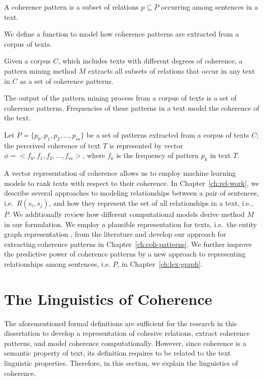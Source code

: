 \begin{definition}
\label{def:def-coh-pattern}
A coherence pattern is a subset of relations $p \subseteq P$ occurring among sentences in a text.   
\end{definition}

We define a function to model how coherence patterns are extracted from a corpus of texts. 

\begin{definition}
Given a corpus $C$, which includes texts with different degrees of coherence, a pattern mining method $M$ extracts all subsets of relations that occur in any text in $C$ as a set of coherence patterns. 
\end{definition} 

The output of the pattern mining process from a corpus of texts is a set of coherence patterns. 
Frequencies of these patterns in a text model the coherence of the text. 

\begin{definition}
Let $P=\lbrace p_0,p_1,p_2,...,p_m \rbrace$ be a set of patterns extracted from a corpus of texts $C$; the perceived coherence of text $T$ is represented by  vector $\phi = <f_0, f_1, f_2,...,f_m>$, where $f_k$ is the frequency of pattern $p_k$ in text $T$. 
\end{definition}

A vector representation of coherence allows us to employ machine learning models to rank texts with respect to their coherence. 
In Chapter~\ref{ch:rel-work}, we describe several approaches to modeling relationships between a pair of sentences, i.e.\ $R(s_i,s_j)$, and how they represent the set of all relationships in a text, i.e., $P$.  
We additionally review how different computational models derive method $M$ in our formulation.  
We employ a plausible representation for texts, i.e.\ the entity graph representation \cite{guinaudeau13}, from the literature and develop our approach for extracting coherence patterns in Chapter~\ref{ch:coh-patterns}. 
We further improve the predictive power of coherence patterns by a new approach to representing relationships among sentences, i.e. $P$, in Chapter~\ref{ch:lex-graph}. 

\section{The Linguistics of Coherence}
\label{sec:coh-linguistics}

The aforementioned formal definitions are sufficient for the research in this dissertation to develop a representation of cohesive relations, extract coherence patterns, and model coherence computationally.  
However, since coherence is a semantic property of text, its definition requires to be related to the text linguistic properties.   
Therefore, in this section, we explain the linguistics of coherence. 


